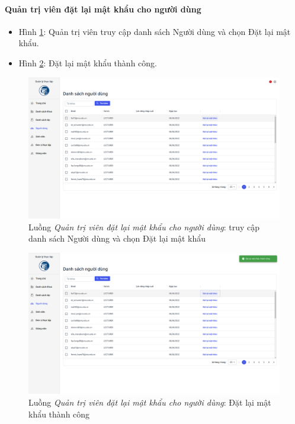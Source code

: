 \documentclass[./../main.tex]{subfiles}
\begin{document}
\paragraph*{Quản trị viên đặt lại mật khẩu cho người dùng}

\begin{itemize}
	\item Hình \ref{fig:admin_access_list_users}: Quản trị viên truy cập danh sách Người dùng và chọn Đặt lại mật khẩu. 
	\item Hình \ref{fig:reset_password_success}: Đặt lại mật khẩu thành công.
\end{itemize}

\begin{figure}[]
	\includegraphics[width=\linewidth]{./images/image69.png}
	\caption{Luồng \emph{Quản trị viên đặt lại mật khẩu cho người dùng}: truy cập danh sách Người dùng và chọn Đặt lại mật khẩu}
	\label{fig:admin_access_list_users}
\end{figure}

\begin{figure}[]
	\includegraphics[width=\linewidth]{./images/image70.png}
	\caption{Luồng \emph{Quản trị viên đặt lại mật khẩu cho người dùng}: Đặt lại mật khẩu thành công}
	\label{fig:reset_password_success}
\end{figure}
\end{document}
